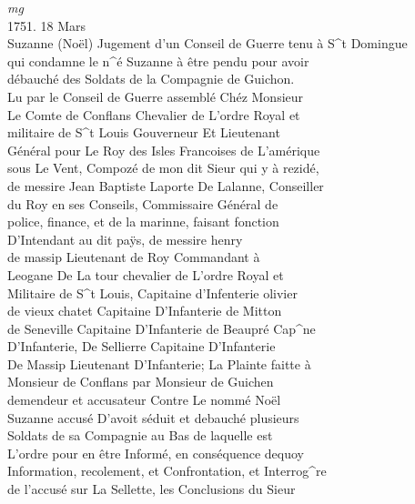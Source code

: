 \documentclass{article}
\begin{document}
\begin{pages}
\vspace{0.5cm}\noindent
\textit{mg}
\footnotesize \\
1751. 18 Mars\\
Suzanne (Noël)
\normalsize \pstart
Jugement d'un Conseil de Guerre tenu à S\^{}t Domingue\\
qui condamne le n\^{}é Suzanne à être pendu pour avoir\\
débauché des Soldats de la Compagnie de Guichon.\\
Lu par le Conseil de Guerre assemblé Chéz Monsieur\\
Le Comte de Conflans Chevalier de L'ordre Royal et\\
militaire de S\^{}t Louis Gouverneur Et Lieutenant\\
Général pour Le Roy des Isles Francoises de L'amérique\\
sous Le Vent, Compozé de mon dit Sieur qui y à rezidé,\\
de messire Jean Baptiste Laporte De Lalanne, Conseiller\\
du Roy en ses Conseils, Commissaire Général de\\
police, finance, et de la marinne, faisant fonction\\
D'Intendant au dit paÿs, de messire henry\\
de massip Lieutenant de Roy Commandant à\\
Leogane De La tour chevalier de L'ordre Royal et\\
Militaire de S\^{}t Louis, Capitaine d'Infenterie olivier\\
de vieux chatet Capitaine D'Infanterie de Mitton\\
de Seneville Capitaine D'Infanterie de Beaupré Cap\^{}ne\\
D'Infanterie, De Sellierre Capitaine D'Infanterie\\
De Massip Lieutenant D'Infanterie; La Plainte faitte à\\
Monsieur de Conflans par Monsieur de Guichen\\
demendeur et accusateur Contre Le nommé Noël\\
Suzanne accusé D'avoit séduit et debauché plusieurs\\
Soldats de sa Compagnie au Bas de laquelle est\\
L'ordre pour en être Informé, en conséquence dequoy\\
Information, recolement, et Confrontation, et Interrog\^{}re\\
de l'accusé sur La Sellette, les Conclusions du Sieur\\

\end{pages}
\end{document}
